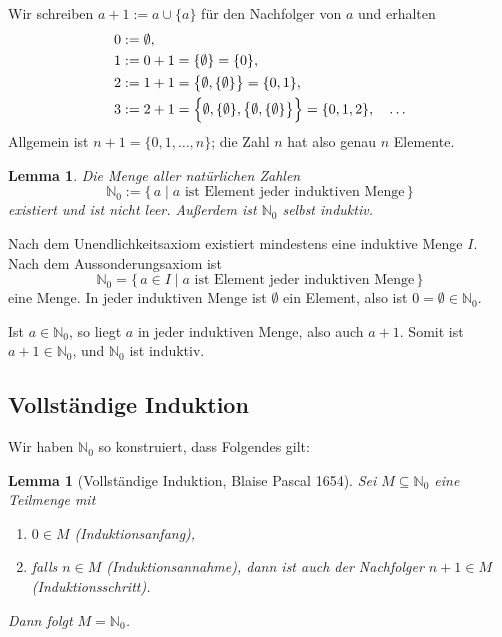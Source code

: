 \documentclass[a4paper]{article}
\makeatletter
\theoremstyle{kurzskript}
\newtheorem{lemma}[satz]{Lemma}
\renewenvironment{proof}[1][\proofname]{\par\pushQED{\qed}%
  \normalfont\topsep\medskipamount\relax
  \trivlist\item[\hskip\labelsep\bfseries #1\@addpunct{.}]\ignorespaces}%
  {\popQED\endtrivlist\@endpefalse}
\renewcommand{\proofname}{Beweis}
\newcommand{\N}{\mathbb{N}}
\makeatother
\begin{document}
Wir schreiben $a + 1 := a \cup \{a\}$ für den Nachfolger von $a$ und erhalten
\begin{align*}
  0 &:= \emptyset, \\
  1 &:= 0 + 1 = \{\emptyset\} = \{0\}, \\
  2 &:= 1 + 1 = \bigl\{\emptyset, \{\emptyset\}\bigr\} = \{0, 1\}, \\
  3 &:= 2 + 1 = \Bigl\{\emptyset, \{\emptyset\}, \bigl\{\emptyset, \{\emptyset\}\bigr\}\Bigr\} = \{0, 1, 2\}, \quad \dots
\end{align*}
Allgemein ist $n + 1 = \{0, 1, \dots, n\}$; die Zahl $n$ hat also genau $n$ Elemente.

\begin{lemma}
Die Menge aller natürlichen Zahlen
\[
  \N_0 := \{\, a \mid a \text{ ist Element jeder induktiven Menge} \,\}
\]
existiert und ist nicht leer. Außerdem ist $\N_0$ selbst induktiv.
\end{lemma}

\begin{proof}
Nach dem Unendlichkeitsaxiom existiert mindestens eine induktive Menge $I$. Nach dem Aussonderungsaxiom ist
\[
  \N_0 = \{\, a \in I \mid a \text{ ist Element jeder induktiven Menge} \,\}
\]
eine Menge. In jeder induktiven Menge ist $\emptyset$ ein Element, also ist $0 = \emptyset \in \N_0$.

Ist $a \in \N_0$, so liegt $a$ in jeder induktiven Menge, also auch $a + 1$. Somit ist $a + 1 \in \N_0$, und $\N_0$ ist induktiv.
\end{proof}

\subsection{Vollständige Induktion}

Wir haben $\N_0$ so konstruiert, dass Folgendes gilt:

\begin{lemma}[Vollständige Induktion, Blaise Pascal 1654]
Sei $M \subseteq \N_0$ eine Teilmenge mit
\begin{enumerate}[label=(\arabic*)]
  \item $0 \in M$ \hfill (\emph{Induktionsanfang}),
  \item falls $n \in M$ \textup{(}\emph{Induktionsannahme}\textup{)}, dann ist auch der Nachfolger $n + 1 \in M$ \hfill (\emph{Induktionsschritt}).
\end{enumerate}
Dann folgt $M = \N_0$.
\end{lemma}
\end{document}
